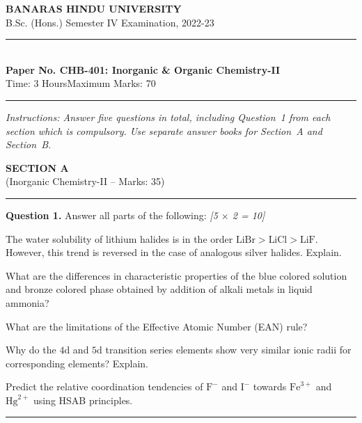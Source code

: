 \documentclass[11pt,a4paper]{article}
\newcommand{\pts}[1]{\hfill   \textit{[#1]}}
\begin{document}
\begin{center}
  {\large\bfseries BANARAS HINDU UNIVERSITY}\\[2pt]
  {\normalsize B.Sc. (Hons.) Semester IV Examination, 2022-23}\\[6pt]
  \rule{0.8\linewidth}{0.5pt}\\[6pt]
  {\large\bfseries Paper No. CHB-401: Inorganic \& Organic Chemistry-II}\\[4pt]
  {\normalsize Time: 3 Hours\hfill Maximum Marks: 70}
\end{center}
\rule{\linewidth}{0.4pt}
\small



\noindent   \textit{Instructions: Answer five questions in total, including Question~1 from each section which is compulsory. Use separate answer books for Section~A and Section~B.}

\normalsize
\bigskip


\begin{center}
  {\large\bfseries SECTION A}\\[2pt]
  {\normalsize (Inorganic Chemistry-II -- Marks: 35)}
\end{center}
\rule{0.4\linewidth}{0.2pt}
\smallskip




\noindent   \textbf{Question 1.} Answer all parts of the following: \pts{5 $ \times$ 2 = 10}

\begin{parts}
  \item The water solubility of lithium halides is in the order $ \text{LiBr} >  \text{LiCl} >  \text{LiF}$. However, this trend is reversed in the case of analogous silver halides. Explain.
  \item What are the differences in characteristic properties of the blue colored solution and bronze colored phase obtained by addition of alkali metals in liquid ammonia?
  \item What are the limitations of the Effective Atomic Number (EAN) rule?
  \item Why do the $4 \text{d}$ and $5 \text{d}$ transition series elements show very similar ionic radii for corresponding elements? Explain.
  \item Predict the relative coordination tendencies of $ \text{F}^-$ and $ \text{I}^-$ towards $ \text{Fe}^{3+}$ and $ \text{Hg}^{2+}$ using HSAB principles.
\end{parts}

\medskip\rule{\linewidth}{0.2pt}
\end{document}
